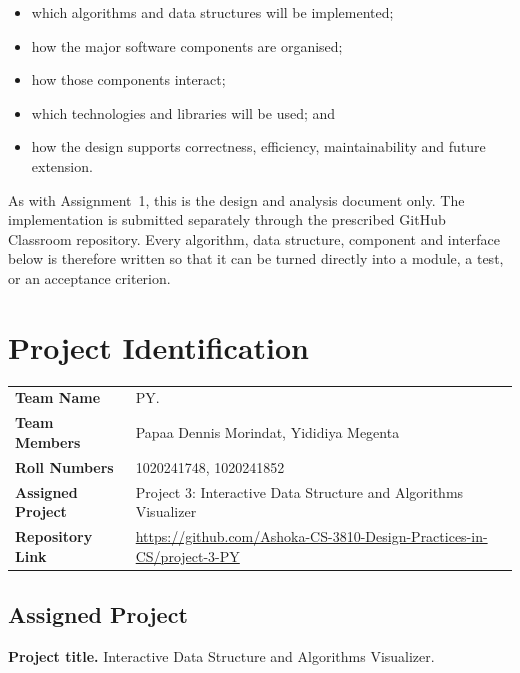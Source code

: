 \documentclass[11pt,a4paper]{article}
\renewcommand{\arraystretch}{1.12}
\begin{document}
\begin{itemize}[leftmargin=1.4em,topsep=2pt,itemsep=1pt]
  \item which algorithms and data structures will be implemented;
  \item how the major software components are organised;
  \item how those components interact;
  \item which technologies and libraries will be used; and
  \item how the design supports correctness, efficiency, maintainability and future extension.
\end{itemize}

As with Assignment~1, this is the design and analysis document only. The implementation is
submitted separately through the prescribed GitHub Classroom repository. Every algorithm,
data structure, component and interface below is therefore written so that it can be turned
directly into a module, a test, or an acceptance criterion.

\section{Project Identification}

\begin{center}
\renewcommand{\arraystretch}{1.25}
\begin{tabular}{@{}L{4.2cm}L{10.4cm}@{}}
\toprule
\textbf{Team Name} & PY. \\
\textbf{Team Members} & Papaa Dennis Morindat, Yididiya Megenta \\
\textbf{Roll Numbers} & 1020241748, 1020241852 \\
\textbf{Assigned Project} & Project 3: Interactive Data Structure and Algorithms Visualizer \\
\textbf{Repository Link} & \url{https://github.com/Ashoka-CS-3810-Design-Practices-in-CS/project-3-PY} \\
\bottomrule
\end{tabular}
\end{center}

\subsection{Assigned Project}

\textbf{Project title.} Interactive Data Structure and Algorithms Visualizer.
\end{document}
